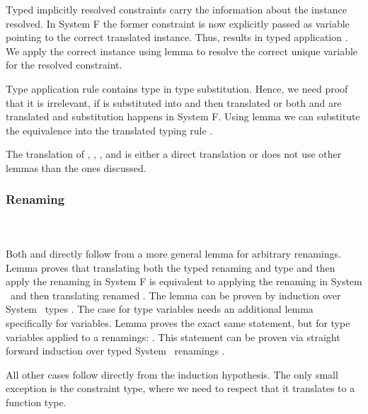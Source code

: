 \noindent Typed implicitly resolved constraints  carry the information about the instance resolved. In System F the former constraint is now explicitly passed as variable pointing to the correct translated instance. 
Thus,  results in typed application . 
We apply the correct instance using lemma  to resolve the correct unique variable for the resolved constraint.

\noindent Type application rule  contains type in type substitution. Hence, we need proof that it is irrelevant, if  is substituted into  and then translated or both  and  are translated and substitution happens in System F. 
Using lemma  we can substitute the equivalence into the translated typing rule  .

\noindent The translation of , , ,  and  is either a direct translation or does not use other lemmas than the ones discussed.

\subsubsection{Renaming}\hfill\\\\
Both  and  directly follow from a more general lemma 
 for arbitrary renamings. Lemma  proves that translating both the typed renaming  and type  and then apply the renaming in System F is equivalent to applying the renaming  in System \Fo\ and then translating renamed . 
The lemma can be proven by induction over System \Fo\ types .
\DPTTypePresRen
The case for type variables needs an additional lemma  specifically for variables.
Lemma  proves the exact same statement, but for type variables applied to a renamings: \DPTVarPresRen. 
This statement can be proven via straight forward induction over typed System \Fo\ renamings .

\noindent All other cases follow directly from the induction hypothesis. 
The only small exception is the constraint type, where we need to respect that it translates to a function type.

